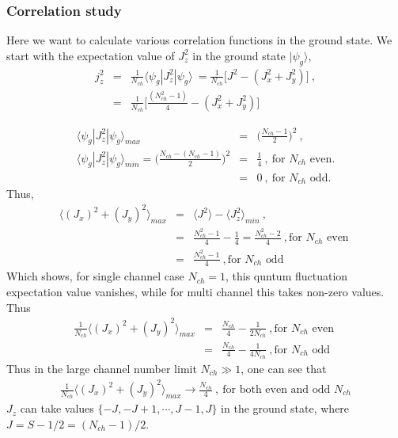 \documentclass[reprint,prb,superscriptaddress]{revtex4-1}
\begin{document}
\subsubsection{Correlation study}
Here we want to calculate various correlation functions in the ground state. We start with the expectation value of $J_z^2$ in the ground state $|\psi_g\rangle$,
\begin{eqnarray}
j_z^2&=&\frac{1}{N_{ch}}\langle \psi_g | J_z^2 | \psi_g \rangle~=\frac{1}{N_{ch}} \bigg[ J^2-(J_x^2+J_y^2) \bigg] ~,\nonumber\\
&=& \frac{1}{N_{ch}} \bigg[ \frac{(N_{ch}^2-1)}{4}-(J_x^2+J_y^2) \bigg]
\end{eqnarray}

\begin{eqnarray}
\langle \psi_g | J_{z}^2 | \psi_g \rangle_{max} &=& \bigg(\frac{N_{ch}-1}{2}\bigg)^2~,\nonumber\\
\langle \psi_g | J_{z}^2 | \psi_g \rangle_{min} = \bigg(\frac{N_{ch}-(N_{ch}-1)}{2}\bigg)^2&=&\frac{1}{4}~,~\textrm{for $N_{ch}$ even}.\nonumber\\
&=& 0 ~,~\textrm{for $N_{ch}$ odd}.
\end{eqnarray}
Thus,
\begin{eqnarray}
\langle (J_x)^2+(J_y)^2 \rangle_{max}&=&\langle J^2 \rangle - \langle J_z^2 \rangle_{min} ~,\nonumber\\
&=& \frac{N_{ch}^2-1}{4}-\frac{1}{4}=\frac{N_{ch}^2-2}{4}~, \textrm{for $N_{ch}$ even } \nonumber\\
&=& \frac{N_{ch}^2-1}{4}~, \textrm{for $N_{ch}$ odd } \nonumber
\end{eqnarray}
Which shows, for single channel case $N_{ch}=1$, this quntum fluctuation expectation value vanishes, while for multi channel this takes non-zero values. Thus 
\begin{eqnarray}
\frac{1}{N_{ch}}\langle (J_x)^2+(J_y)^2 \rangle_{max}
&=& \frac{N_{ch}}{4}-\frac{1}{2N_{ch}}  ~, \textrm{for $N_{ch}$ even } \nonumber\\
&=& \frac{N_{ch}}{4}-\frac{1}{4N_{ch}}~, \textrm{for $N_{ch}$ odd } \nonumber
\end{eqnarray}
Thus in the large channel number limit $N_{ch}\gg 1$, one can see that 
\begin{eqnarray}
\frac{1}{N_{ch}}\langle (J_x)^2+(J_y)^2 \rangle_{max}
\rightarrow \frac{N_{ch}}{4}~,~\textrm{for both even and odd $N_{ch}$}
\end{eqnarray}
\noindent $J_z$ can take values $\{-J,-J+1,\cdots,J-1,J\}$ in the ground state, where $J=S-1/2=(N_{ch}-1)/2$.
\end{document}
